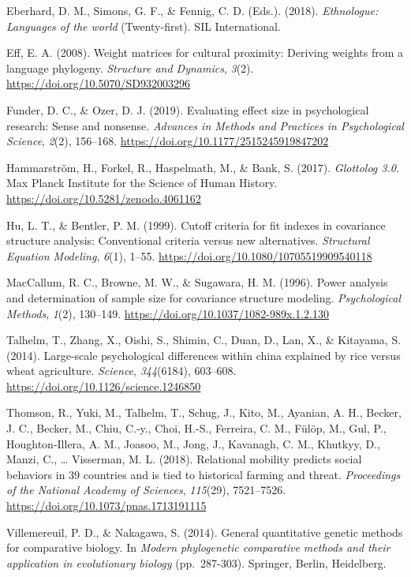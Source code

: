 \documentclass[
  man,floatsintext]{apa6}
\begin{document}
Eberhard, D. M., Simons, G. F., \& Fennig, C. D. (Eds.). (2018). \emph{Ethnologue: Languages of the world} (Twenty-first). SIL International.

Eff, E. A. (2008). Weight matrices for cultural proximity: Deriving weights from a language phylogeny. \emph{Structure and Dynamics}, \emph{3}(2). \url{https://doi.org/10.5070/SD932003296}

Funder, D. C., \& Ozer, D. J. (2019). Evaluating effect size in psychological research: Sense and nonsense. \emph{Advances in Methods and Practices in Psychological Science}, \emph{2}(2), 156--168. \url{https://doi.org/10.1177/2515245919847202}

Hammarström, H., Forkel, R., Haspelmath, M., \& Bank, S. (2017). \emph{Glottolog 3.0.} Max Planck Institute for the Science of Human History. \url{https://doi.org/10.5281/zenodo.4061162}

Hu, L. T., \& Bentler, P. M. (1999). Cutoff criteria for fit indexes in covariance structure analysis: Conventional criteria versus new alternatives. \emph{Structural Equation Modeling}, \emph{6}(1), 1--55. \url{https://doi.org/10.1080/10705519909540118}

MacCallum, R. C., Browne, M. W., \& Sugawara, H. M. (1996). Power analysis and determination of sample size for covariance structure modeling. \emph{Psychological Methods}, \emph{1}(2), 130--149. \url{https://doi.org/10.1037/1082-989x.1.2.130}

Talhelm, T., Zhang, X., Oishi, S., Shimin, C., Duan, D., Lan, X., \& Kitayama, S. (2014). Large-scale psychological differences within china explained by rice versus wheat agriculture. \emph{Science}, \emph{344}(6184), 603--608. \url{https://doi.org/10.1126/science.1246850}

Thomson, R., Yuki, M., Talhelm, T., Schug, J., Kito, M., Ayanian, A. H., Becker, J. C., Becker, M., Chiu, C.-y., Choi, H.-S., Ferreira, C. M., Fülöp, M., Gul, P., Houghton-Illera, A. M., Joasoo, M., Jong, J., Kavanagh, C. M., Khutkyy, D., Manzi, C., \ldots{} Visserman, M. L. (2018). Relational mobility predicts social behaviors in 39 countries and is tied to historical farming and threat. \emph{Proceedings of the National Academy of Sciences}, \emph{115}(29), 7521--7526. \url{https://doi.org/10.1073/pnas.1713191115}

Villemereuil, P. D., \& Nakagawa, S. (2014). General quantitative genetic methods for comparative biology. In \emph{Modern phylogenetic comparative methods and their application in evolutionary biology} (pp.~287-303). Springer, Berlin, Heidelberg.
\end{document}
